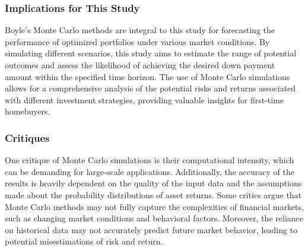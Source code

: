 \subsubsection{Implications for This Study}
Boyle's Monte Carlo methods are integral to this study for forecasting the performance of optimized portfolios under various market conditions. By simulating different scenarios, this study aims to estimate the range of potential outcomes and assess the likelihood of achieving the desired down payment amount within the specified time horizon. The use of Monte Carlo simulations allows for a comprehensive analysis of the potential risks and returns associated with different investment strategies, providing valuable insights for first-time homebuyers.

\subsubsection{Critiques}
One critique of Monte Carlo simulations is their computational intensity, which can be demanding for large-scale applications. Additionally, the accuracy of the results is heavily dependent on the quality of the input data and the assumptions made about the probability distributions of asset returns. Some critics argue that Monte Carlo methods may not fully capture the complexities of financial markets, such as changing market conditions and behavioral factors. Moreover, the reliance on historical data may not accurately predict future market behavior, leading to potential misestimations of risk and return.

\newpage
